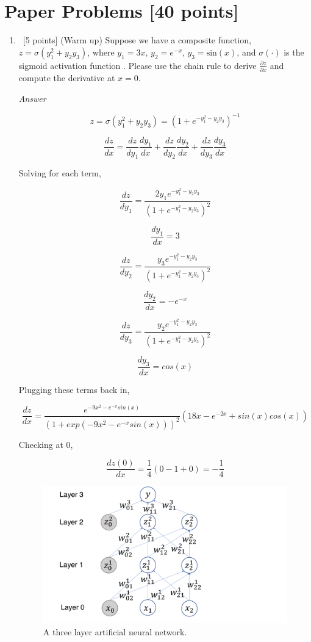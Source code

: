 \documentclass[12pt, fullpage,letterpaper]{article}
\begin{document}
\section{Paper Problems [40 points]}
\begin{enumerate}
	\item~[5 points] (Warm up) Suppose we have a composite function, $z = \sigma(y_1^2 +y_2y_3) $, where  $y_1 = 3x$, $y_2 = e^{-x}$, $y_3 = \mathrm{sin}(x)$, and $\sigma(\cdot)$ is the sigmoid activation function . Please use the chain rule to derive $\frac{\partial z}{\partial x}$ and  compute the derivative at $x=0$. 
	
	\emph{Answer}
	
	\[
	    z = \sigma (y_1^2 + y_2 y_3) = (1 + e^{-y_1^2 - y_2 y_3})^{-1}
	\]
	
	\[
	    \frac{dz}{dx} = \frac{dz}{dy_1} \frac{dy_1}{dx} + \frac{dz}{dy_2} \frac{dy_2}{dx} + \frac{dz}{dy_3} \frac{dy_3}{dx}
	\]
	
	Solving for each term,
	
	\[
	    \frac{dz}{dy_1} = \frac{2 y_1 e^{-y_1^2 - y_2 y_3}}{(1 + e^{-y_1^2 - y_2 y_3})^2}
	\]
	
	\[
	    \frac{dy_1}{dx} = 3
	\]
	
	\[
	    \frac{dz}{dy_2} = \frac{y_3 e^{-y_1^2 - y_2 y_3}}{(1 + e^{-y_1^2 - y_2 y_3})^2}
	\]
	
	\[
	    \frac{dy_2}{dx} = -e^{-x}
	\]
	
	\[
	    \frac{dz}{dy_3} = \frac{y_2 e^{-y_1^2 - y_2 y_3}}{(1 + e^{-y_1^2 - y_2 y_3})^2}
	\]
	
	\[
	    \frac{dy_3}{dx} = cos(x)
	\]
	
	Plugging these terms back in,
	
	\[
	    \frac{dz}{dx} = \frac{e^{-9x^2 - e^{-x} sin(x)}}{(1 + exp(-9x^2 - e^{-x} sin(x)))^2} (18x - e^{-2x} + sin(x) cos(x))
	\]
	
	Checking at 0,
	
	\[
	    \frac{dz(0)}{dx} = \frac{1}{4} (0 -1 + 0) = - \frac{1}{4}
	\]
	
	\begin{figure}
		\centering
		\includegraphics[width=1.0\textwidth]{./3-layer-NN.pdf}
		\caption{\small A three layer artificial neural network.} 
		\label{fig:3nn}
	\end{figure}
	

\end{enumerate}
\end{document}
